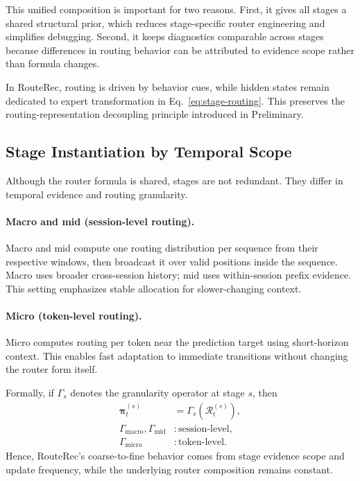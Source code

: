 \documentclass[sigconf,review,anonymous]{acmart}
\begin{document}
This unified composition is important for two reasons. First, it gives all stages a shared structural prior, which reduces stage-specific router engineering and simplifies debugging. Second, it keeps diagnostics comparable across stages because differences in routing behavior can be attributed to evidence scope rather than formula changes.

In RouteRec, routing is driven by behavior cues, while hidden states remain dedicated to expert transformation in Eq.~\eqref{eq:stage-routing}. This preserves the routing-representation decoupling principle introduced in Preliminary.

\subsection{Stage Instantiation by Temporal Scope}

Although the router formula is shared, stages are not redundant. They differ in temporal evidence and routing granularity.

\paragraph{Macro and mid (session-level routing).}
Macro and mid compute one routing distribution per sequence from their respective windows, then broadcast it over valid positions inside the sequence. Macro uses broader cross-session history; mid uses within-session prefix evidence. This setting emphasizes stable allocation for slower-changing context.

\paragraph{Micro (token-level routing).}
Micro computes routing per token near the prediction target using short-horizon context. This enables fast adaptation to immediate transitions without changing the router form itself.

Formally, if $\Gamma_s$ denotes the granularity operator at stage $s$, then
\[
\begin{aligned}
\boldsymbol{\pi}^{(s)}_t &= \Gamma_s\!\left(\mathcal{R}^{(s)}_t\right), \\
\Gamma_{\mathrm{macro}},\Gamma_{\mathrm{mid}} &: \text{session-level}, \\
\Gamma_{\mathrm{micro}} &: \text{token-level}.
\end{aligned}
\]
Hence, RouteRec's coarse-to-fine behavior comes from stage evidence scope and update frequency, while the underlying router composition remains constant.
\end{document}
